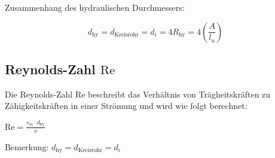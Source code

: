 Zusammenhang des hydraulischen Durchmessers:

\[
d_{\text{hy}} = d_{\text{Kreisrohr}} = d_i = 4 R_{\text{hy}} = 4 \left(\frac{A}{l_u}\right)
\]



\subsection{Reynolds-Zahl $\text{Re}$}

Die Reynolds-Zahl $\text{Re}$ beschreibt das Verhältnis von Trägheitskräften zu Zähigkeitskräften in einer Strömung und wird wie folgt berechnet:


$\boxed{\text{Re} = \frac{v_m \cdot d_{\text{hy}}}{\nu}}$

\vspace{0.25cm}

Bemerkung: $d_{\text{hy}} = d_{\text{Kreisrohr}} = d_i$

